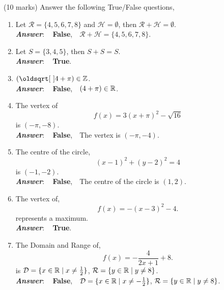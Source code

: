 \documentclass[12pt]{article} %
\begin{document}
\begin{qstn} %
  (10 marks) Answer the following True/False questions,
  \begin{enumerate}
    \item Let $\mathcal{R} = \{4,5,6,7,8\} $ and $\mathcal{H} = \emptyset $, then $\mathcal{R} + \mathcal{H} = \emptyset $.\\
      \textbf{\emph{Answer}}: \,\,\, \textbf{False}, \,\, $\mathcal{R} + \mathcal{H} =   \{4,5,6,7,8\}$.\\

    \item Let $S = \{3,4,5\} $, then $S + S = S$.\\
      \textbf{\emph{Answer}}: \,\,\, \textbf{True}. \,\,\\

    \item $(\sqrt{4} + \pi) \in \Z$.\\
      \textbf{\emph{Answer}}: \,\,\, \textbf{False}, \,\, $(4 + \pi) \in \mathbb R$.\\

    \item The vertex of 
      \[
        f(x) = 3\left( x + \pi \right)^2 - \sqrt{16}  
      \] is $(-\pi,-8)$.\\ 
      \textbf{\emph{Answer}}: \,\,\, \textbf{False}, \,\, The vertex is $(-\pi, -4)$.\\

    \item The centre of the circle,
      \[
            (x-1)^2 + (y -2)^2 = 4
      \] is $(-1,-2)$.\\
      \textbf{\emph{Answer}}: \,\,\, \textbf{False}, \,\, The centre of the circle is $(1,2)$.\\

    \item The vertex of,
      \[
            f(x) = -\left( x - 3 \right)^2 - 4
      .\] represents a maximum.\\
      \textbf{\emph{Answer}}: \,\,\, \textbf{True}. \,\,\\

    \item The Domain and Range of,
      \[
              f(x) = -\frac{4}{2x + 1} + 8
    .\] is $\mathcal{D} = \{x \in \mathbb R \mid x \neq \frac{1}{2}\} $, $\mathcal{R} = \{y \in \mathbb R \mid y \neq 8\} $.\\
      \textbf{\emph{Answer}}: \,\,\, \textbf{False}, \,\,  $\mathcal{D} = \{x \in \mathbb R \mid x \neq -\frac{1}{2}\} $, $\mathcal{R} = \{y \in \mathbb R \mid y \neq 8\} $.\\


\end{enumerate}
\end{qstn}
\end{document}
